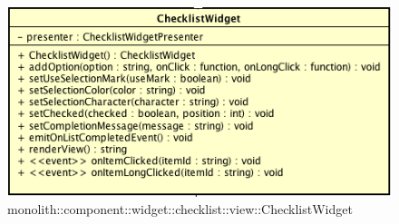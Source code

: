 \label{monolith::component::widget::checklist::view::ChecklistWidget}
\begin{figure}[H]
	\centering
	\includegraphics[scale=0.5]{Sezioni/SottosezioniST/img/ChecklistWidget.png}
	\caption{monolith::component::widget::checklist::view::ChecklistWidget}
\end{figure}

